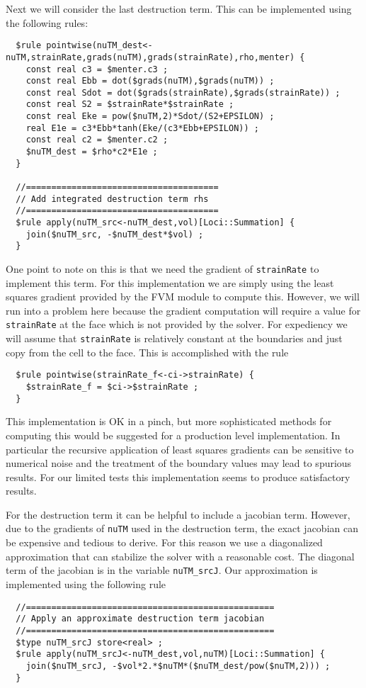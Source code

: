 \documentclass[letterpaper,twoside]{article}
\begin{document}
Next we will consider the last destruction term.  This can be
implemented using the following rules:
\begin{verbatim}
  $rule pointwise(nuTM_dest<-nuTM,strainRate,grads(nuTM),grads(strainRate),rho,menter) {
    const real c3 = $menter.c3 ;
    const real Ebb = dot($grads(nuTM),$grads(nuTM)) ;
    const real Sdot = dot($grads(strainRate),$grads(strainRate)) ;
    const real S2 = $strainRate*$strainRate ;
    const real Eke = pow($nuTM,2)*Sdot/(S2+EPSILON) ;
    real E1e = c3*Ebb*tanh(Eke/(c3*Ebb+EPSILON)) ;
    const real c2 = $menter.c2 ;
    $nuTM_dest = $rho*c2*E1e ;
  }

  //======================================
  // Add integrated destruction term rhs
  //======================================
  $rule apply(nuTM_src<-nuTM_dest,vol)[Loci::Summation] {
    join($nuTM_src, -$nuTM_dest*$vol) ;
  }
\end{verbatim}
One point to note on this is that we need the gradient of {\tt strainRate}
to implement this term.  For this implementation we are simply using
the least squares gradient provided by the FVM module to compute
this.  However, we will run into a problem here because the gradient
computation will require a value for {\tt strainRate} at the face which is
not provided by the solver.  For expediency we will assume that 
{\tt strainRate} is relatively constant at the boundaries and just
copy from the cell to the face.  This is accomplished with the rule
\begin{verbatim}
  $rule pointwise(strainRate_f<-ci->strainRate) {
    $strainRate_f = $ci->$strainRate ;
  }
\end{verbatim}
This implementation is OK in a pinch, but more sophisticated methods
for computing this would be suggested for a production level
implementation.  In particular the recursive application of least
squares gradients can be sensitive to numerical noise and the
treatment of the boundary values may lead to spurious results.  For
our limited tests this implementation seems to produce satisfactory
results.

For the destruction term it can be helpful to include a jacobian
term.  However, due to the gradients of {\tt nuTM} used in the
destruction term, the exact jacobian can be expensive and tedious to
derive.  For this reason we use a diagonalized approximation that can
stabilize the solver with a reasonable cost.  The diagonal term of the
jacobian is in the variable {\tt nuTM\_srcJ}.  Our approximation is
implemented using the following rule
\begin{verbatim}
  //=================================================
  // Apply an approximate destruction term jacobian
  //=================================================
  $type nuTM_srcJ store<real> ;
  $rule apply(nuTM_srcJ<-nuTM_dest,vol,nuTM)[Loci::Summation] {
    join($nuTM_srcJ, -$vol*2.*$nuTM*($nuTM_dest/pow($nuTM,2))) ;
  }
\end{verbatim}
\end{document}
